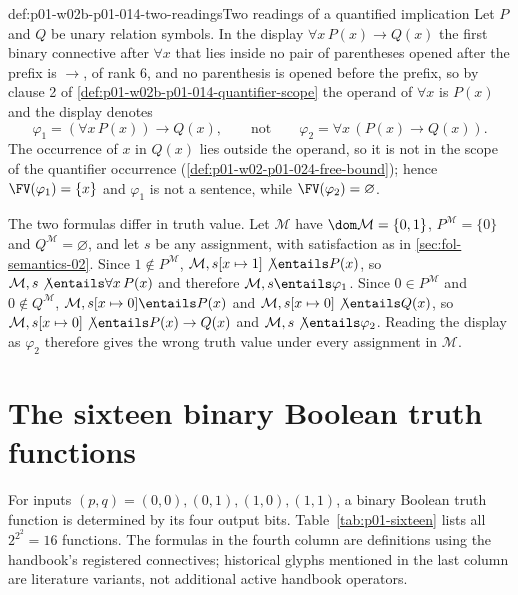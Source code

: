 \begin{hbexample}{def:p01-w02b-p01-014-two-readings}{Two readings of a quantified implication}
Let \(P\) and \(Q\) be unary relation symbols.  In the display
\(\forall x\,P(x)\to Q(x)\) the first binary connective after
\(\forall x\) that lies inside no pair of parentheses opened after the
prefix is \(\to\), of rank 6, and no parenthesis is opened before the
prefix, so by clause 2 of \cref{def:p01-w02b-p01-014-quantifier-scope} the
operand of \(\forall x\) is \(P(x)\) and the display denotes
\[
  \varphi_1=(\forall x\,P(x))\to Q(x),
  \qquad\text{not}\qquad
  \varphi_2=\forall x\,(P(x)\to Q(x)).
\]
The occurrence of \(x\) in \(Q(x)\) lies outside the operand, so it is not
in the scope of the quantifier occurrence
(\cref{def:p01-w02-p01-024-free-bound}); hence \(\FV(\varphi_1)=\{x\}\) and
\(\varphi_1\) is not a sentence, while \(\FV(\varphi_2)=\varnothing\).

The two formulas differ in truth value.  Let \(\mathcal M\) have
\(\dom\mathcal M=\{0,1\}\), \(P^{\mathcal M}=\{0\}\) and
\(Q^{\mathcal M}=\varnothing\), and let \(s\) be any assignment, with
satisfaction as in \cref{sec:fol-semantics-02}.  Since
\(1\notin P^{\mathcal M}\), \(\mathcal M,s[x\mapsto1]\not\entails P(x)\), so
\(\mathcal M,s\not\entails\forall x\,P(x)\) and therefore
\(\mathcal M,s\entails\varphi_1\).  Since \(0\in P^{\mathcal M}\) and
\(0\notin Q^{\mathcal M}\), \(\mathcal M,s[x\mapsto0]\entails P(x)\) and
\(\mathcal M,s[x\mapsto0]\not\entails Q(x)\), so
\(\mathcal M,s[x\mapsto0]\not\entails P(x)\to Q(x)\) and
\(\mathcal M,s\not\entails\varphi_2\).  Reading the display as
\(\varphi_2\) therefore gives the wrong truth value under every assignment
in \(\mathcal M\).
\end{hbexample}

\section{The sixteen binary Boolean truth functions}
\label{sec:p01-sixteen-functions}

For inputs \((p,q)=(0,0),(0,1),(1,0),(1,1)\), a binary Boolean truth
function is determined by its four output bits.  Table~\ref{tab:p01-sixteen}
lists all \(2^{2^2}=16\) functions.  The formulas in the fourth column are
definitions using the handbook's registered connectives; historical glyphs
mentioned in the last column are literature variants, not additional active
handbook operators.

